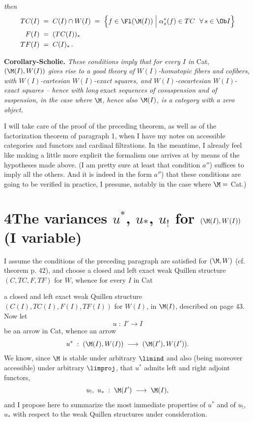 \noindent\textit{then}
\[
\begin{aligned}
TC(I) \;&=\; C(I)\cap W(I) \;=\; \Bigl\{ f \in \Fl(\M(I)) \Bigm| \alpha_s^*(f) \in TC \ \ \forall\, s \in \Ob I \Bigr\}\\
F(I) \;&=\; (TC(I))_*\\
TF(I) \;&=\; C(I)_*\,.
\end{aligned}
\]

\textbf{Corollary-Scholie.} \textit{These conditions imply that for every $I$ in} Cat, \textit{$(\M(I),W(I))$ gives rise to a good theory of $W(I)$-homotopic fibers and cofibers, with $W(I)$-cartesian $W(I)$-exact squares, and $W(I)$-cocartesian $W(I)$-exact squares – hence with long} exact \textit{sequences of cosuspension and of suspension, in the case where $\M$, hence also $\M(I)$, is a category with a zero object.}

\noindent{}

I will take care of the proof of the preceding theorem, as well as of the factorization theorem of paragraph 1, when I have my notes on accessible categories and functors and cardinal filtrations. In the meantime, I already feel like making a little more explicit the formalism one arrives at by means of the hypotheses made above. (I am pretty sure at least that condition $a''$) suffices to imply all the others. And it is indeed in the form $a''$) that these conditions are going to be verified in practice, I presume, notably in the case where $\M = $ Cat.)

\section*{4\quad The variances $u^*$, $u_*$, $u_{!}$ for $(\M(I),W(I))$ (I variable)}

I assume the conditions of the preceding paragraph are satisfied for $(\M,W)$ (cf. theorem p. 42), and choose a closed and left exact weak Quillen structure $(C,TC,F,TF)$ for $W$, whence for every $I$ in Cat

\noindent{}

\noindent a closed and left exact weak Quillen structure $(C(I),TC(I),F(I),TF(I))$ for $W(I)$, in $\M(I)$, described on page 43. Now let
\[
u \;:\; I' \longrightarrow I
\]
be an arrow in Cat, whence an arrow
\[
u^* \;:\; (\M(I),W(I)) \;\longrightarrow\; (\M(I'),W(I')).
\]
We know, since $\M$ is stable under arbitrary $\limind$ and also (being moreover accessible) under arbitrary $\limproj$, that $u^*$ admits left and right adjoint functors,
\[
u_{!},\ u_* \;:\; \M(I') \;\longrightarrow\; \M(I),
\]
and I propose here to summarize the most immediate properties of $u^*$ and of $u_{!}$, $u_*$ with respect to the weak Quillen structures under consideration.


